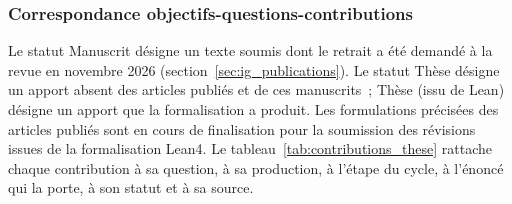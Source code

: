 \begin{sloppypar}
\subsubsection{Correspondance objectifs-questions-contributions}
\label{subsubsec:correspondance_objectifs}

Le statut \og Manuscrit\fg{} d\'esigne un texte soumis dont le retrait a \'et\'e demand\'e \`a la revue en novembre 2026 (section~\ref{sec:ig_publications}). Le statut \og Th\`ese\fg{} d\'esigne un apport absent des articles publi\'es et de ces manuscrits~; \og Th\`ese (issu de Lean)\fg{} d\'esigne un apport que la formalisation a produit. Les formulations pr\'ecis\'ees des articles publi\'es sont en cours de finalisation pour la soumission des r\'evisions issues de la formalisation Lean4. Le tableau~\ref{tab:contributions_these} rattache chaque contribution \`a sa question, \`a sa production, \`a l'\'etape du cycle, \`a l'\'enonc\'e qui la porte, \`a son statut et \`a sa source.


\end{sloppypar}
